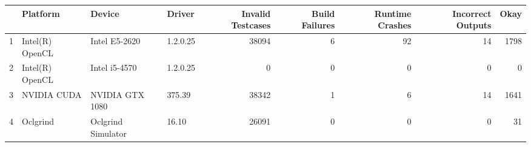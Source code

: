 \begin{tabular}{llllrrrrr}
\toprule
{} &         Platform &              Device &    Driver &  Invalid Testcases &  Build Failures &  Runtime Crashes &  Incorrect Outputs &  Okay \\
\midrule
1 &  Intel(R) OpenCL &       Intel E5-2620 &  1.2.0.25 &              38094 &               6 &               92 &                 14 &  1798 \\
2 &  Intel(R) OpenCL &       Intel i5-4570 &  1.2.0.25 &                  0 &               0 &                0 &                  0 &     0 \\
3 &      NVIDIA CUDA &     NVIDIA GTX 1080 &    375.39 &              38342 &               1 &                6 &                 14 &  1641 \\
4 &         Oclgrind &  Oclgrind Simulator &     16.10 &              26091 &               0 &                0 &                  0 &    31 \\
\bottomrule
\end{tabular}
